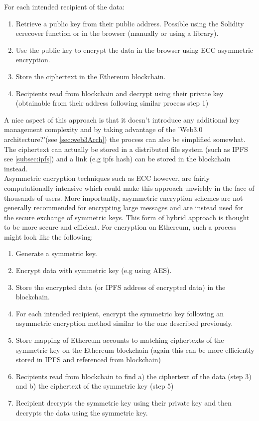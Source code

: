 For each intended recipient of the data:\\
\begin{enumerate}
\item Retrieve a public key from their public address. Possible using the Solidity ecrecover function\cite{SolidityCheatsheet} or in the browser (manually\cite{StackExchangeAddress} or using a library\cite{WalletJS}).

\item Use the public key to encrypt the data in the browser using ECC asymmetric encryption.

\item Store the ciphertext in the Ethereum blockchain.

\item Recipients read from blockchain and decrypt using their private key (obtainable from their address following similar process step 1) 

\end{enumerate}

A nice aspect of this approach is that it doesn't introduce any additional key management complexity and by taking advantage of the 'Web3.0 architecture?'(see \ref{sec:web3Arch}) the process can also be simplified somewhat. The ciphertext can actually be stored in a distributed file system (such as IPFS see  \ref{subsec:ipfs}) and a link (e.g ipfs hash) can be stored in the blockchain instead. \\

Asymmetric encryption techniques such as ECC however, are fairly computationally intensive which could make this approach unwieldy in the face of thousands of users. More importantly, asymmetric encryption schemes are not generally recommended for encrypting large messages and are instead used for the secure exchange of symmetric keys. This form of hybrid approach is thought to be more secure and efficient. For encryption on Ethereum, such a process might look like the following:

\begin{enumerate}
\item Generate a symmetric key. 
\item Encrypt data with symmetric key (e.g using AES).
\item Store the encrypted data (or IPFS address of encrypted data) in the blockchain.
\item For each intended recipient, encrypt the symmetric key following an asymmetric encryption method similar to the one described previously.
\item Store mapping of Ethereum accounts to matching ciphertexts of the symmetric key on the Ethereum blockchain (again this can be more efficiently stored in IPFS and referenced from blockchain)
\item Recipients read from blockchain to find a) the ciphertext of the data (step 3) and b) the ciphertext of the symmetric key (step 5)
\item Recipient decrypts the symmetric key using their private key and then decrypts the data using the symmetric key.
\end{enumerate}


